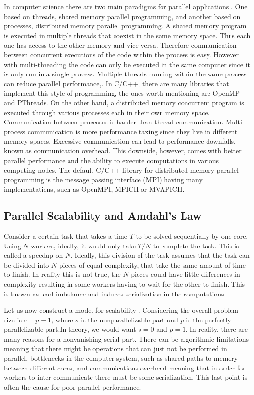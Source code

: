 		In computer science there are two main paradigms for parallel applications \cite{Hager2011}. One based on threads, shared memory parallel programming, and another based on processes, distributed memory parallel programming. 
A shared memory program is executed in multiple threads that coexist in the same memory space. Thus each one has access to the other memory and vice-versa. Therefore communication between concurrent executions of the code within the process is easy. However with multi-threading the code can only be executed in the same computer since it is only run in a single process. Multiple threads running within the same process can reduce parallel performance,. In C/C++, there are many libraries that implement this style of programming, the ones worth mentioning are OpenMP and PThreads. 
On the other hand, a distributed memory concurrent program is executed through various processes each in their own memory space. Communication between processes is harder than thread communication. Multi process communication is more performance taxing since they live in different memory spaces. Excessive communication can lead to performance downfalls, known as communication overhead. This downside, however, comes with better parallel performance and the ability to execute computations in various computing nodes. The default C/C++ library for distributed memory parallel programming is the message passing interface (MPI) having many implementations, such as OpenMPI, MPICH or MVAPICH.


\subsection{Parallel Scalability and Amdahl's Law}

	Consider a certain task that takes a time $T$ to be solved sequentially by one core. Using $N$ workers, ideally, it would only take $T / N$ to complete the task. This is called a speedup on $N$. Ideally, this division of the task assumes that the task can be divided into $N$ pieces of equal complexity, that take the same amount of time to finish. In reality this is not true, the $N$ pieces could have little differences in complexity resulting in some workers having to wait for the other to finish. This is known as load imbalance and induces serialization in the computations.
	
	Let us now construct a model for scalability \cite{Hager2011}. Considering the overall problem size is $s + p = 1$, where $s$ is the nonparallelizable part and $p$ is the perfectly parallelizable part.In theory, we would want $s=0$ and $p=1$. In reality, there are many reasons for a nonvanishing serial part. There can be algorithmic limitations meaning that there might be operations that can just not be performed in parallel, bottlenecks in the computer system, such as shared paths to memory between different cores, and communications overhead meaning that in order for workers to inter-communicate there must be some serialization. This last point is often the cause for poor parallel performance. 
		
